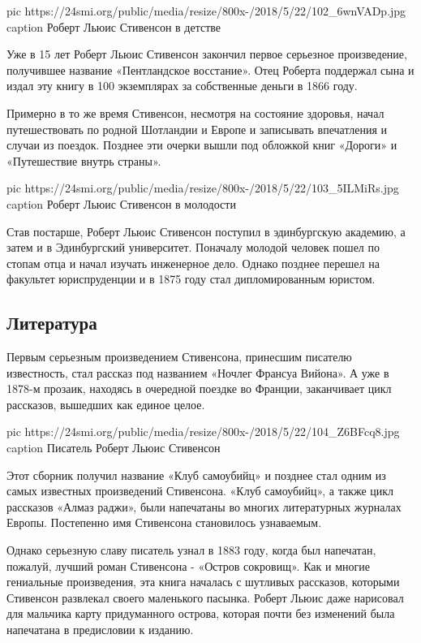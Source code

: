 \ifcmt
pic https://24smi.org/public/media/resize/800x-/2018/5/22/102_6wnVADp.jpg
caption Роберт Льюис Стивенсон в детстве
\fi


Уже в 15 лет Роберт Льюис Стивенсон закончил первое серьезное
произведение, получившее название «Пентландское восстание». Отец Роберта
поддержал сына и издал эту книгу в 100 экземплярах за собственные деньги в
1866 году.

Примерно в то же время Стивенсон, несмотря на состояние здоровья, начал
путешествовать по родной Шотландии и Европе и записывать впечатления и
случаи из поездок. Позднее эти очерки вышли под обложкой книг «Дороги» и
«Путешествие внутрь страны».

\ifcmt
pic https://24smi.org/public/media/resize/800x-/2018/5/22/103_5ILMiRs.jpg
caption Роберт Льюис Стивенсон в молодости
\fi

Став постарше, Роберт Льюис Стивенсон поступил в эдинбургскую академию, а
затем и в Эдинбургский университет. Поначалу молодой человек пошел по
стопам отца и начал изучать инженерное дело. Однако позднее перешел на
факультет юриспруденции и в 1875 году стал дипломированным юристом.

\subsection{Литература}

Первым серьезным произведением Стивенсона, принесшим писателю известность,
стал рассказ под названием «Ночлег Франсуа Вийона». А уже в 1878-м
прозаик, находясь в очередной поездке во Франции, заканчивает цикл
рассказов, вышедших как единое целое.

\ifcmt
pic https://24smi.org/public/media/resize/800x-/2018/5/22/104_Z6BFcq8.jpg
caption Писатель Роберт Льюис Стивенсон
\fi


Этот сборник получил название «Клуб самоубийц» и позднее стал одним из
самых известных произведений Стивенсона. «Клуб самоубийц», а также цикл
рассказов «Алмаз раджи», были напечатаны во многих литературных журналах
Европы. Постепенно имя Стивенсона становилось узнаваемым.

Однако серьезную славу писатель узнал в 1883 году, когда был напечатан,
пожалуй, лучший роман Стивенсона - «Остров сокровищ». Как и многие
гениальные произведения, эта книга началась с шутливых рассказов, которыми
Стивенсон развлекал своего маленького пасынка. Роберт Льюис даже нарисовал
для мальчика карту придуманного острова, которая почти без изменений была
напечатана в предисловии к изданию.

